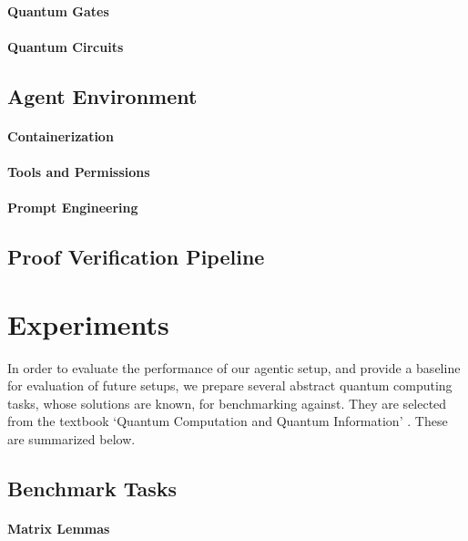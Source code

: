 \documentclass[letterpaper]{article} %
\begin{document}
\paragraph{Quantum Gates}

\paragraph{Quantum Circuits}

\subsection{Agent Environment}

\paragraph{Containerization}

\paragraph{Tools and Permissions}

\paragraph{Prompt Engineering}

\subsection{Proof Verification Pipeline}



\section{Experiments}

In order to evaluate the performance of our agentic setup, and provide a baseline
for evaluation of future setups, we prepare several abstract
quantum computing tasks, whose solutions are known, for benchmarking against.
They are selected from the textbook `Quantum Computation and Quantum Information' \cite{nielsen2010quantum}.
These are summarized below.

\subsection{Benchmark Tasks}

\paragraph{Matrix Lemmas}
\end{document}
